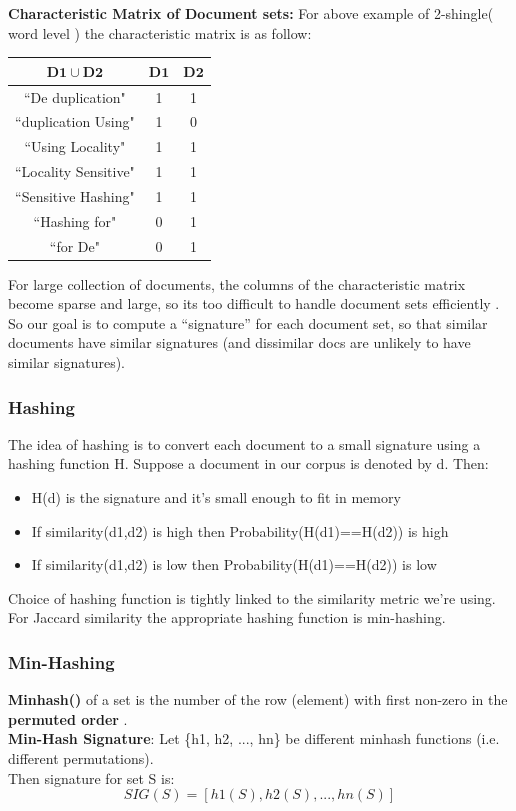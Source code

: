 \documentclass[12pt, a4paper,twoside]{article}
\begin{document}
\textbf{Characteristic Matrix  of Document sets:}
For above example of 2-shingle( word level ) the characteristic matrix is as follow: \\
\begin{table}[H]
\begin{center}
\begin{tabular}{|c|c|c|}
\hline
$\bm{D1 \cup D2}$ &$\bm{ D1}$ &$\bm{ D2}$\\
\hline
``De duplication"&1 & 1 \\
\hline
``duplication Using"& 1  & 0 \\
\hline
``Using Locality" & 1 & 1\\
\hline
``Locality Sensitive"&1 & 1\\
\hline
``Sensitive Hashing"& 1 & 1 \\
\hline
``Hashing for"& 0 & 1 \\
\hline
``for De"& 0 & 1 \\
\hline
\end{tabular}
\end{center}
\end{table}
For large collection of documents, the columns of the characteristic matrix become sparse and large, so its too difficult to handle document sets efficiently .\\
So our goal is to compute a “signature” for each document set, so that similar documents have similar signatures (and dissimilar docs are unlikely to have similar signatures). \\
\subsubsection*{Hashing}
The idea of hashing is to convert each document to a small signature using a hashing function H. Suppose a document in our corpus is denoted by d. Then:
\begin{itemize}
\item H(d) is the signature and it’s small enough to fit in memory
\item   If similarity(d1,d2) is high then Probability(H(d1)==H(d2)) is high
\item    If similarity(d1,d2) is low then Probability(H(d1)==H(d2)) is low
\end{itemize}
Choice of hashing function is tightly linked to the similarity metric we’re using. For Jaccard similarity the appropriate hashing function is min-hashing.

\subsubsection*{Min-Hashing}
\textbf{Minhash(\bm{$\pi$})} of a set is the number of the row (element) with first non-zero in the \textbf{permuted order \bm{$\pi$}}.\\
\textbf{Min-Hash Signature}: Let \{h1, h2, ..., hn\} be different minhash functions (i.e. different permutations).\\ Then signature for set S is:  
$$SIG(S) = [h1(S),  h2(S), ...,  hn(S)]$$ 
\end{document}
